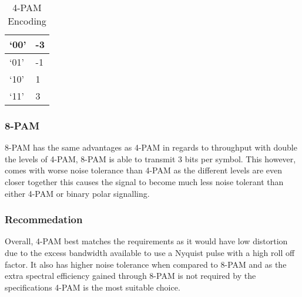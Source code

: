 \begin{table}[h]
    \label{table:4-pam-coding}
    \caption{4-PAM Encoding}
    \begin{center}
        \begin{tabular} { | m{1cm} || m{1cm} | }
           \hline
           {`00'} & {-3} \\
           \hline
           {`01'} & {-1} \\
           \hline
           {`10'} & {1} \\
           \hline
           {`11'} & {3} \\
           \hline
        \end{tabular}
    \end{center}
\end{table}


\subsubsection{8-PAM}
8-PAM has the same advantages as 4-PAM in regards to throughput with double the levels of 4-PAM, 8-PAM is able to transmit 3
bits per symbol. This however, comes with worse noise tolerance than 4-PAM as the different levels are even closer together
this causes the signal to become much less noise tolerant than either 4-PAM or binary polar signalling.

\subsubsection{Recommedation}
Overall, 4-PAM best matches the requirements as it would have low distortion due to the excess bandwidth available to use a Nyquist pulse
with a high roll off factor. It also has higher noise tolerance when compared to 8-PAM and as the extra spectral efficiency gained through
8-PAM is not required by the specifications 4-PAM is the most suitable choice.

